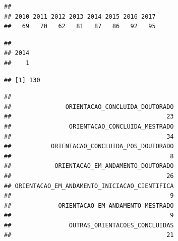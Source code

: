 \documentclass[]{article}
\newenvironment{Shaded}{\begin{snugshade}}{\end{snugshade}}
\newcommand{\KeywordTok}[1]{\textcolor[rgb]{0.13,0.29,0.53}{\textbf{#1}}}
\newcommand{\CommentTok}[1]{\textcolor[rgb]{0.56,0.35,0.01}{\textit{#1}}}
\newcommand{\ControlFlowTok}[1]{\textcolor[rgb]{0.13,0.29,0.53}{\textbf{#1}}}
\newcommand{\OperatorTok}[1]{\textcolor[rgb]{0.81,0.36,0.00}{\textbf{#1}}}
\newcommand{\NormalTok}[1]{#1}
\begin{document}
\begin{verbatim}
## 
## 2010 2011 2012 2013 2014 2015 2016 2017 
##   69   70   62   81   87   86   92   95
\end{verbatim}

\begin{Shaded}
\end{Shaded}

\begin{verbatim}
## 
## 2014 
##    1
\end{verbatim}

\begin{Shaded}
\end{Shaded}

\begin{verbatim}
## [1] 130
\end{verbatim}

\begin{Shaded}
\end{Shaded}

\begin{verbatim}
## 
##               ORIENTACAO_CONCLUIDA_DOUTORADO 
##                                           23 
##                ORIENTACAO_CONCLUIDA_MESTRADO 
##                                           34 
##           ORIENTACAO_CONCLUIDA_POS_DOUTORADO 
##                                            8 
##            ORIENTACAO_EM_ANDAMENTO_DOUTORADO 
##                                           26 
## ORIENTACAO_EM_ANDAMENTO_INICIACAO_CIENTIFICA 
##                                            9 
##             ORIENTACAO_EM_ANDAMENTO_MESTRADO 
##                                            9 
##                OUTRAS_ORIENTACOES_CONCLUIDAS 
##                                           21
\end{verbatim}
\end{document}

